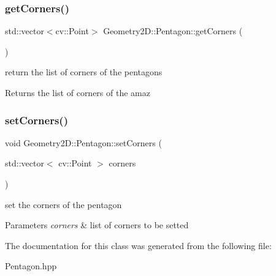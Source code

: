 \subsubsection{\texorpdfstring{get\+Corners()}{getCorners()}}
{\footnotesize\ttfamily std\+::vector$<$cv\+::\+Point$>$ Geometry2\+D\+::\+Pentagon\+::get\+Corners (\begin{DoxyParamCaption}{ }\end{DoxyParamCaption})}

return the list of corners of the pentagons \begin{DoxyReturn}{Returns}
the list of corners of the amaz 
\end{DoxyReturn}
\mbox{\label{class_geometry2_d_1_1_pentagon_ae65ba44439b3fccd94c35b74b877e05f}} 
\subsubsection{\texorpdfstring{set\+Corners()}{setCorners()}}
{\footnotesize\ttfamily void Geometry2\+D\+::\+Pentagon\+::set\+Corners (\begin{DoxyParamCaption}\item[{std\+::vector$<$ cv\+::\+Point $>$}]{corners }\end{DoxyParamCaption})}

set the corners of the pentagon 
\begin{DoxyParams}{Parameters}
{\em corners} & list of corners to be setted \\
\hline
\end{DoxyParams}


The documentation for this class was generated from the following file\+:\begin{DoxyCompactItemize}
\item 
Pentagon.\+hpp\end{DoxyCompactItemize}
